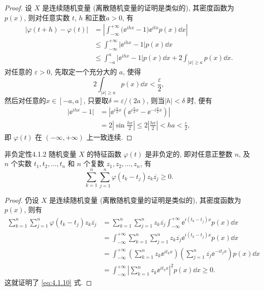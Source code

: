 \begin{proof}
    设 $ X $ 是连续随机变量 (离散随机变量的证明是类似的), 其密度函数为 $ p (x) $, 则对任意实数 $t$, $h$ 和正数$ a > 0 $, 有
    \begin{align*}
        \lvert \varphi ( t + h ) - \varphi (t) \rvert & = \left\lvert \int_{-\infty}^{+\infty} \bigl( \ee^{ihx} - 1 \bigr) \ee^{itx} p (x) \dd x \right\rvert\\
        & \leq \int_{-\infty}^{+\infty} \bigl\lvert \ee^{ihx} - 1 \bigr\rvert p (x) \dd x\\
        & \leq \int_{-a}^a \bigl\lvert \ee^{ihx} - 1 \bigr\rvert p (x) \dd x + 2 \int_{\lvert x \rvert \geq a} p (x) \dd x.
    \end{align*}
    对任意的 $ \varepsilon > 0 $, 先取定一个充分大的 $ a $, 使得
    \begin{equation*}
        2 \int_{\lvert x \rvert \geq a} p (x) \dd x < \frac{\varepsilon}{2},
    \end{equation*}
    然后对任意的$ x \in [-a,a] $, 只要取$ \delta = \varepsilon/(2a) $, 则当$ \lvert h \rvert < \delta $ 时, 便有
    \begin{align*}
        \lvert \ee^{ihx} - 1 \rvert & = \left\lvert \ee^{i \frac{h}{2} x} \left( \ee^{i \frac{h}{2} x} - \ee^{-i \frac{h}{2} x} \right) \right\rvert\\
        & = 2 \left\lvert \sin \frac{hx}{2} \right\rvert
        \leq 2 \left\lvert \frac{hx}{2} \right\rvert
        < ha
        < \frac{\varepsilon}{2},
    \end{align*}
    即 $ \varphi (t) $ 在 $ (-\infty, +\infty) $ 上一致连续.
\end{proof}

\begin{theorem}{非负定性}{4.1.2}
    随机变量 $ X $ 的特征函数 $ \varphi (t) $ 是非负定的, 即对任意正整数 $ n $, 及 $ n $ 个实数 $ t_1, t_2, \dotsc, t_n $ 和 $ n $ 个复数 $ z_1, z_2, \dotsc, z_n $, 有
    \begin{equation}\label{eq:4.1.10}
        \sum_{k=1}^n \sum_{j=1}^n \varphi ( t_k - t_j ) z_k \overline{z_j} \geq 0.
    \end{equation}
\end{theorem}

\begin{proof}
    仍设 $ X $ 是连续随机变量 (离散随机变量的证明是类似的), 其密度函数为 $ p (x) $, 则有
    \begin{align*}
        \sum_{k=1}^n \sum_{j=1}^n \varphi ( t_k - t_j ) z_k \overline{z_j}
        & = \sum_{k=1}^n \sum_{j=1}^n z_k \overline{z_j} \int_{-\infty}^{+\infty} \ee^{i (t_k - t_j) x} p (x) \dd x\\
        & = \int_{-\infty}^{+\infty} \sum_{k=1}^n \sum_{j=1}^n z_k \overline{z_j} \ee^{i (t_k - t_j) x} p (x) \dd x\\
        & = \int_{-\infty}^{+\infty} \left( \sum_{k=1}^n z_k \ee^{i t_k x} \right) \left( \sum_{j=1}^n \overline{z_j} \ee^{-i t_j x} \right) p (x) \dd x\\
        & = \int_{-\infty}^{+\infty} \left\lvert \sum_{k=1}^n z_k \ee^{i t_k x} \right\lvert^2 p (x) \dd x \geq 0.
    \end{align*}
    这就证明了 \eqref{eq:4.1.10} 式.
\end{proof}

